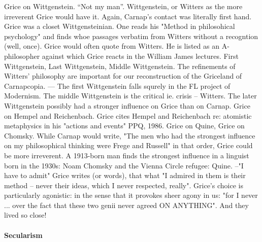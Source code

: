 \documentclass[10pt,titlepage]{book}
\begin{document}
{Grice  on Wittgenstein. “Not my man”. Wittgenstein, or Witters as the more 
irreverent  Grice would have it. Again, Carnap's contact was literally 
first hand. Grice  was a closet Wittgensteinian. One reads his "Method in 
philosohical  psychology" and finds whoe passages verbatim from Witters without a 
recogntion  (well, once). Grice would often quote from Witters. He is listed 
as an  A-philosopher against which Grice reacts in the William James 
lectures. First  Wittgenstein, Last Wittgenstein, Middle Wittgenstein. The 
refinements of  Witters' philosophy are important for our reconstruction of the 
Griceland of  Carnapcopia. --- The first Wittgenstein falls squrely in the FL 
project of  Modernism. The middle Wittgenstein is the critical ie. crisis -- 
Witters. The  later Wittgenstein possibly had  a stronger influence on Grice 
than on  Carnap. 
Grice  on Hempel and Reichenbach. Grice cites Hempel and Reichenbach re: 
atomistic  metaphysics in his "actions and events" PPQ, 1986.  
Grice  on Quine, Grice on Chomsky. While  Carnap would write, "The men who 
had the strongest  influence on my  philosophical thinking were Frege and 
Russell" in that order,  Grice could  be more irreverent. A 1913-born man 
finds the strongest influence in  a  linguist born in the 1930s: Noam Chomsky 
and the Vienna Circle refugee:  Quine.  --"I have to admit" Grice writes (or 
words), that what "I admired  in them is  their method -- never their ideas, 
which I never respected,  really". Grice's choice is particularly agonistic: 
in the sense that it provokes  sheer agony in  us: "for I never ... over 
the fact that these two genii  never agreed ON  ANYTHING". And they lived so 
close!

\paragraph{Secularism}

}
\end{document}
